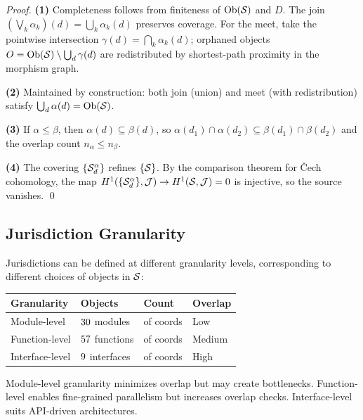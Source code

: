 \documentclass[11pt]{article}
\begin{document}
\begin{proof}
\textbf{(1)} Completeness follows from finiteness of $\mathrm{Ob}(\mathcal{S})$ and $D$.
The join $(\bigvee_k \alpha_k)(d) = \bigcup_k \alpha_k(d)$ preserves coverage.
For the meet, take the pointwise intersection
$\gamma(d) = \bigcap_k \alpha_k(d)$; orphaned objects
$O = \mathrm{Ob}(\mathcal{S}) \setminus \bigcup_d \gamma(d)$ are redistributed by
shortest-path proximity in the morphism graph.

\textbf{(2)} Maintained by construction: both join (union) and meet (with
redistribution) satisfy $\bigcup_d \alpha(d) = \mathrm{Ob}(\mathcal{S})$.

\textbf{(3)} If $\alpha \leq \beta$, then $\alpha(d) \subseteq \beta(d)$,
so $\alpha(d_1) \cap \alpha(d_2) \subseteq \beta(d_1) \cap \beta(d_2)$ and
the overlap count $n_\alpha \leq n_\beta$.

\textbf{(4)} The covering $\{\mathcal{S}_d^\alpha\}$ refines $\{\mathcal{S}\}$. By the
comparison theorem for \v{C}ech cohomology, the map
$H^{1}(\{\mathcal{S}_d^\alpha\}, \mathcal{J}) \to H^{1}(\mathcal{S}, \mathcal{J}) = 0$ is injective,
so the source vanishes. \qed
\end{proof}

\subsection{Jurisdiction Granularity}\label{sec:granularity}

Jurisdictions can be defined at different granularity levels, corresponding to
different choices of objects in $\mathcal{S}$:

\begin{center}
\begin{tabular}{llll}
\toprule
\textbf{Granularity} & \textbf{Objects} & \textbf{Count} & \textbf{Overlap} \\
\midrule
Module-level   & $30{}$ modules
               & \suppCoordModulePct{} of coords
               & Low \\
Function-level & $57{}$ functions
               & \suppCoordFunctionPct{} of coords
               & Medium \\
Interface-level & $9{}$ interfaces
               & \suppCoordInterfacePct{} of coords
               & High \\
\bottomrule
\end{tabular}
\end{center}

Module-level granularity minimizes overlap but may create bottlenecks.
Function-level enables fine-grained parallelism but increases overlap checks.
Interface-level suits API-driven architectures.
\end{document}
